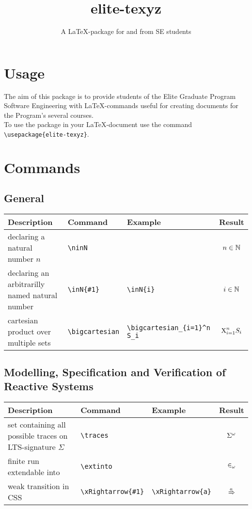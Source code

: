 \documentclass{scrartcl}
\title{elite-texyz}
\subtitle{A \LaTeX -package for and from SE students}
\date{}
\begin{document}
\maketitle

\newpage

\tableofcontents

\newpage

\section{Usage}
The aim of this package is to provide students of the Elite Graduate Program Software Engineering with \LaTeX -commands useful for creating documents for the Program's several courses.\\
\medskip
To use the package in your \LaTeX -document use the command \verb|\usepackage{elite-texyz}|.

\section{Commands}
\subsection{General}
\begin{tabular}{p{6cm}|l|l|c}
	\hline
	Description & Command & Example & Result\\
	\hline
	declaring a natural number $n$ & \verb|\ninN| & & $n\in\mathbb{N}$ \\
	declaring an arbitrarilly named natural number & \verb|\inN{#1}| & \verb|\inN{i}| & $i\in\mathbb{N}$ \\
	cartesian product over multiple sets & \verb|\bigcartesian| & \verb|\bigcartesian_{i=1}^n S_i| & $\text{X}_{i=1}^n S_i$\\
	\hline
\end{tabular}

\subsection{Modelling, Specification and Verification of Reactive Systems}
\begin{tabular}{p{6cm}|l|l|c}
	\hline
	Description & Command & Example & Result\\
	\hline
	set containing all possible traces on LTS-signature $\Sigma$ & \verb|\traces| & & $\Sigma^\omega$ \\
	finite run extendable into & \verb|\extinto| & & $\in_\omega$ \\
	weak transition in CSS & \verb|\xRightarrow{#1}| & \verb|\xRightarrow{a}| & $\xRightarrow{a}$ \\
	\hline
\end{tabular}
\end{document}

